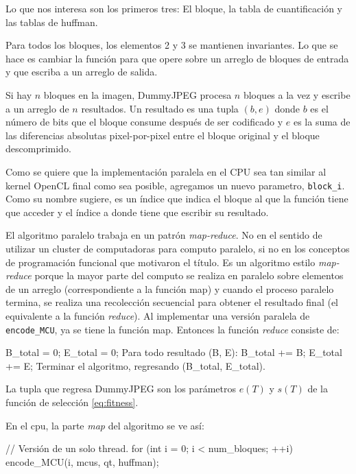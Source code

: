 Lo que nos interesa son los primeros tres: El bloque, la tabla de
cuantificación y las tablas de huffman.

Para todos los bloques, los elementos 2 y 3 se mantienen invariantes. Lo que se
hace es cambiar la función para que opere sobre un arreglo de bloques de
entrada y que escriba a un arreglo de salida.

Si hay $n$ bloques en la imagen, DummyJPEG procesa $n$ bloques a la vez y
escribe a un arreglo de $n$ resultados. Un resultado es una tupla $(b, e)$
donde $b$ es el número de bits que el bloque consume después de ser codificado
y $e$ es la suma de las diferencias absolutas pixel-por-pixel entre el bloque
original y el bloque descomprimido.

Como se quiere que la implementación paralela en el CPU sea tan similar al
kernel OpenCL final como sea posible, agregamos un nuevo parametro,
\verb+block_i+. Como su nombre sugiere, es un índice que indica el bloque al
que la función tiene que acceder y el índice a donde tiene que escribir su
resultado.

El algoritmo paralelo trabaja en un patrón \emph{map-reduce}. No en el sentido
de utilizar un cluster de computadoras para computo paralelo, si no en los
conceptos de programación funcional que motivaron el título. Es un algoritmo
estilo \emph{map-reduce} porque la mayor parte del computo se realiza en
paralelo sobre elementos de un arreglo (correspondiente a la función map) y
cuando el proceso paralelo termina, se realiza una recolección secuencial para
obtener  el resultado final (el equivalente a la función \emph{reduce}). Al implementar una
versión paralela de \verb+encode_MCU+, ya se tiene la función map. Entonces la
función \emph{reduce} consiste de:

\label{alg:mcu_paralelo}
\begin{code}
    B_total = 0;
    E_total = 0;
    Para todo resultado (B, E):
       B_total += B;
       E_total += E;
    Terminar el algoritmo, regresando (B_total, E_total).
\end{code}

La tupla que regresa DummyJPEG son los parámetros $e(T)$ y $s(T)$ de la función de selección
\ref{eq:fitness}.

En el cpu, la parte \emph{map} del algoritmo se ve así:

\begin{code}[language=C][h]
    // Versión de un solo thread.
    for (int i = 0; i < num_bloques; ++i) {
        encode_MCU(i, mcus, qt, huffman);
    }
\end{code}

